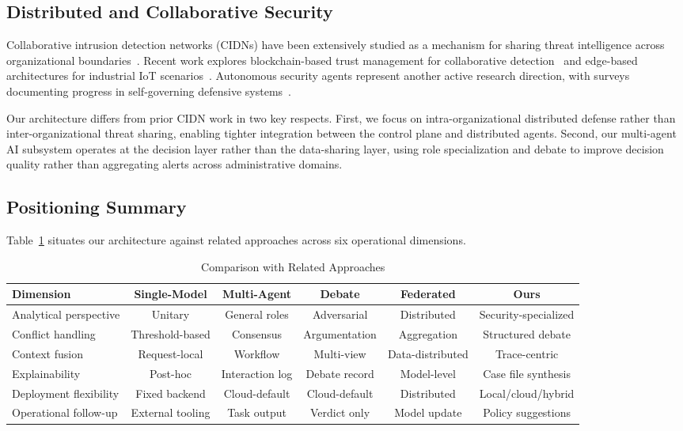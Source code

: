 \subsection{Distributed and Collaborative Security}
\label{subsec:collaborative-security}

Collaborative intrusion detection networks (CIDNs) have been extensively studied as a mechanism for sharing threat intelligence across organizational boundaries~\cite{vasilomanolakis2016taxonomy}. Recent work explores blockchain-based trust management for collaborative detection~\cite{meng2023blockchain} and edge-based architectures for industrial IoT scenarios~\cite{alhawawreh2023edge}. Autonomous security agents represent another active research direction, with surveys documenting progress in self-governing defensive systems~\cite{barrere2022autonomous}.

Our architecture differs from prior CIDN work in two key respects. First, we focus on intra-organizational distributed defense rather than inter-organizational threat sharing, enabling tighter integration between the control plane and distributed agents. Second, our multi-agent AI subsystem operates at the decision layer rather than the data-sharing layer, using role specialization and debate to improve decision quality rather than aggregating alerts across administrative domains.

\subsection{Positioning Summary}
\label{subsec:positioning}

Table~\ref{tab:comparison} situates our architecture against related approaches across six operational dimensions.

\begin{table}[htbp]
\centering
\caption{Comparison with Related Approaches}
\label{tab:comparison}
\begin{tabular}{|l|c|c|c|c|c|}
\hline
\textbf{Dimension} & \textbf{Single-Model} & \textbf{Multi-Agent} & \textbf{Debate} & \textbf{Federated} & \textbf{Ours} \\
\hline
Analytical perspective & Unitary & General roles & Adversarial & Distributed & Security-specialized \\
Conflict handling & Threshold-based & Consensus & Argumentation & Aggregation & Structured debate \\
Context fusion & Request-local & Workflow & Multi-view & Data-distributed & Trace-centric \\
Explainability & Post-hoc & Interaction log & Debate record & Model-level & Case file synthesis \\
Deployment flexibility & Fixed backend & Cloud-default & Cloud-default & Distributed & Local/cloud/hybrid \\
Operational follow-up & External tooling & Task output & Verdict only & Model update & Policy suggestions \\
\hline
\end{tabular}
\end{table}

